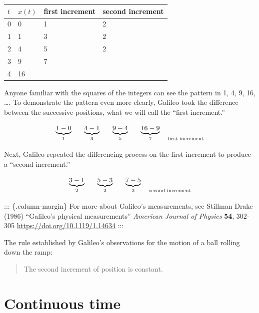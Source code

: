\documentclass[
  letterpaper,
  DIV=11,
  numbers=noendperiod,
  oneside]{scrreprt}
\begin{document}
\begin{table}

\caption{Galileo's observations and their first \& second
increments.}\begin{minipage}[t]{\linewidth}

{\centering 

\begin{longtable}[]{@{}llll@{}}
\toprule
\(t\) & \(x(t)\) & first increment & second increment \\
\midrule
\endhead
0 & 0 & 1 & 2 \\
1 & 1 & 3 & 2 \\
2 & 4 & 5 & 2 \\
3 & 9 & 7 & \\
4 & 16 & & \\
\bottomrule
\end{longtable}

}

\end{minipage}%

\end{table}

Anyone familiar with the squares of the integers can see the pattern in
1, 4, 9, 16, \ldots. To demonstrate the pattern even more clearly,
Galileo took the difference between the successive positions, what we
will call the ``first increment.''

\[\underbrace{1 - 0}_1 \ \ \ \ \ \underbrace{4 - 1}_3\ \ \ \ \ \underbrace{9 - 4}_{5}\ \ \ \ \ \underbrace{16-9}_7\ \ \ \underset{{\Large\strut}\text{first increment}}{\text{}}\]
Next, Galileo repeated the differencing process on the first increment
to produce a ``second increment.''

\[\underbrace{3 - 1}_2 \ \ \ \ \ \underbrace{5 - 3}_2\ \ \ \ \ \underbrace{7 - 5}_{2}\ \ \ \underset{{\Large\strut}\text{second increment}}{\text{}}\]
::: \{.column-margin\} For more about Galileo's measurements, see
Stillman Drake (1986) ``Galileo's physical measurements'' \emph{American
Journal of Physics} \textbf{54}, 302-305
\url{https://doi.org/10.1119/1.14634} :::

The rule established by Galileo's observations for the motion of a ball
rolling down the ramp:

\begin{quote}
The second increment of position is constant.
\end{quote}

\hypertarget{continuous-time}{%
\section{Continuous time}\label{continuous-time}}
\end{document}
